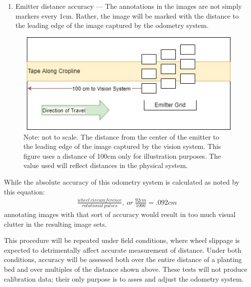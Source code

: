 \documentclass[12pt]{article}
\begin{document}
{\begin{enumerate}
	\item{Emitter distance accuracy --- The annotations in the images are not simply markers every 1cm. Rather, the image will be marked with the distance to the leading edge of the image captured by the odometry system.}
\end{enumerate}
\begin{figure}[H]
	\centering
	\includegraphics[width=0.75\linewidth]{./figures/test-distance.jpg}
	\caption[Test for distance measurement from emitter]{Note: not to scale. The distance from the center of the emitter to the leading edge of the image captured by the vision system. This figure uses a distance of 100cm only for illustration purposes. The value used will reflect distances in the physical system.}
	\label{fig:test-distance}
\end{figure}

While the absolute accuracy of this odometry system is calculated as noted by this equation:
\begin{align}
\frac {wheel\ circumference}  {rotational\ pulses},\  or\  \frac {92cm} {1000} = .092cm
\end{align}
annotating images with that sort of accuracy would result in too much visual clutter in the resulting image sets.

This procedure will be repeated under field conditions, where wheel slippage is expected to detrimentally affect accurate measurement of distance. Under both conditions, accuracy will be assessed both over the entire distance of a planting bed and over multiples of the distance shown above. These tests will not produce calibration data; their only purpose is to asses and adjust the odometry system.
}
\end{document}
